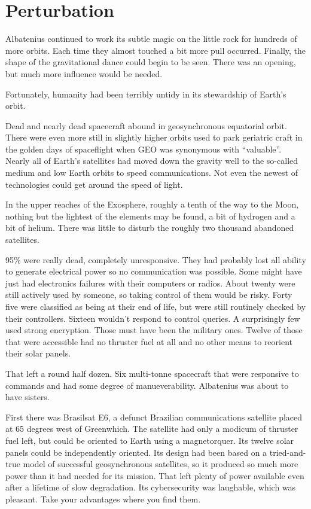 %
%

\chapter{Perturbation}

Albatenius continued to work its subtle magic on the little rock for hundreds of more orbits. Each time they almost touched a bit more pull occurred. Finally, the shape of the gravitational dance could begin to be seen. There was an opening, but much more influence would be needed.

Fortunately, humanity had been terribly untidy in its stewardship of Earth's orbit.

Dead and nearly dead spacecraft abound in geosynchronous equatorial orbit. There were even more still in slightly higher orbits used to park geriatric craft in the golden days of spaceflight when GEO was synonymous with ``valuable''. Nearly all of Earth's satellites had moved down the gravity well to the so-called medium and low Earth orbits to speed communications. Not even the newest of technologies could get around the speed of light.

In the upper reaches of the Exosphere, roughly a tenth of the way to the Moon, nothing but the lightest of the elements may be found, a bit of hydrogen and a bit of helium. There was little to disturb the roughly two thousand abandoned satellites.

95\% were really dead, completely unresponsive. They had probably lost all ability to generate electrical power so no communication was possible. Some might have just had electronics failures with their computers or radios. About twenty were still actively used by someone, so taking control of them would be risky. Forty five were classified as being at their end of life, but were still routinely checked by their controllers. Sixteen wouldn't respond to control queries. A surprisingly few used strong encryption. Those must have been the military ones. Twelve of those that were accessible had no thruster fuel at all and no other means to reorient their solar panels.

That left a round half dozen. Six multi-tonne spacecraft that were responsive to commands and had some degree of manueverability. Albatenius was about to have sisters.

First there was Brasilsat E6, a defunct Brazilian communications satellite placed at 65 degrees west of Greenwhich. The satellite had only a modicum of thruster fuel left, but could be oriented to Earth using a magnetorquer. Its twelve solar panels could be independently oriented. Its design had been based on a tried-and-true model of successful geosynchronous satellites, so it produced so much more power than it had needed for its mission. That left plenty of power available even after a lifetime of slow degradation. Its cybersecurity was laughable, which was pleasant. Take your advantages where you find them.

